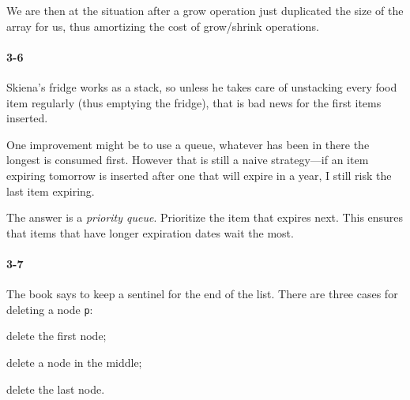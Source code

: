 \documentclass{report}
\newcommand{\li}{\lstinline}
\begin{document}
\begin{enumerate}[label=\alph*)]
\begin{center}
        \end{center}

        We are then at the situation after a grow operation just duplicated the size of the array for us, thus amortizing the cost of grow/shrink operations.
\end{enumerate}

\paragraph{3-6}Skiena's fridge works as a stack, so unless he takes care of unstacking every food item regularly (thus emptying the fridge), that is bad news for the first items inserted.

One improvement might be to use a queue, whatever has been in there the longest is consumed first. However that is still a naive strategy---if an item expiring tomorrow is inserted after one that will expire in a year, I still risk the last item expiring.

The answer is a \emph{priority queue}. Prioritize the item that expires next. This ensures that items that have longer expiration dates wait the most.

\paragraph{3-7} The book says to keep a sentinel for the end of the list. There are three cases for deleting a node \li!p!: \begin{enumerate*}[label=\arabic*)]\item delete the first node; \item delete a node in the middle; \item delete the last node.\end{enumerate*}
\end{document}
